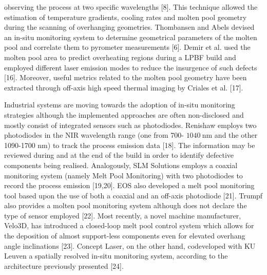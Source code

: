 \documentclass[10pt]{article}
\begin{document}
observing the process at two specific wavelengths [8]. This technique allowed the estimation of temperature gradients, cooling rates and molten pool geometry during the scanning of overhanging geometries. Thombansen and Abels devised an in-situ monitoring system to determine geometrical parameters of the molten pool and correlate them to pyrometer measurements [6]. Demir et al. used the molten pool area to predict overheating regions during a LPBF build and employed different laser emission modes to reduce the insurgence of such defects [16]. Moreover, useful metrics related to the molten pool geometry have been extracted through off-axis high speed thermal imaging by Criales et al. [17].

Industrial systems are moving towards the adoption of in-situ monitoring strategies although the implemented approaches are often non-disclosed and mostly consist of integrated sensors such as photodiodes. Renishaw employs two photodiodes in the NIR wavelength range (one from 700- $1040 \mathrm{~nm}$ and the other 1090-1700 nm) to track the process emission data [18]. The information may be reviewed during and at the end of the build in order to identify defective components being realised. Analogously, SLM Solutions employs a coaxial monitoring system (namely Melt Pool Monitoring) with two photodiodes to record the process emission [19,20]. EOS also developed a melt pool monitoring tool based upon the use of both a coaxial and an off-axis photodiode [21]. Trumpf also provides a molten pool monitoring system although does not declare the type of sensor employed [22]. Most recently, a novel machine manufacturer, Velo3D, has introduced a closed-loop melt pool control system which allows for the deposition of almost support-less components even for elevated overhang angle inclinations [23]. Concept Laser, on the other hand, codeveloped with KU Leuven a spatially resolved in-situ monitoring system, according to the architecture previously presented [24].
\end{document}

